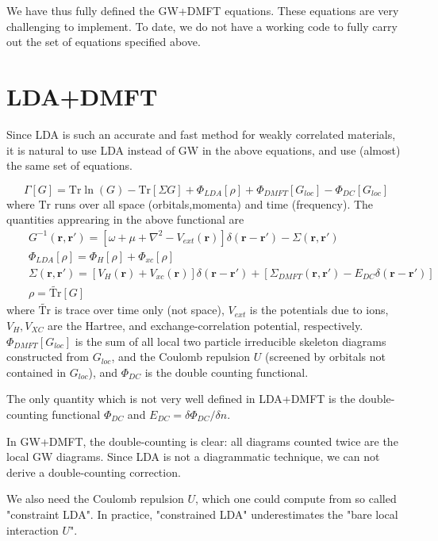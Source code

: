 \documentclass[usenames,letter,landscape,semhelv]{seminar}
\newcommand{\vr}{{\mathbf{r}}}
\renewcommand{\Tr}{\mathrm{Tr}}
\begin{document}
\begin{slide}
We have thus fully defined the GW+DMFT equations. These equations are
very challenging to implement. To date, we do not have a working code
to fully carry out the set of equations specified above.

\newslide

\section{LDA+DMFT}

Since LDA is such an accurate and fast method for weakly correlated
materials, it is natural to use LDA instead of GW in the above
equations, and use (almost) the same set of equations.

\begin{equation}
\Gamma[G] = \Tr\ln(G) - \Tr[\Sigma G] + \Phi_{LDA}[\rho] + \Phi_{DMFT}[G_{loc}] -\Phi_{DC}[G_{loc}]
\label{functional}
\end{equation}
where $\Tr$ runs over all space (orbitals,momenta) and time
(frequency).
The quantities apprearing in the above functional are
\begin{eqnarray}
&& G^{-1}(\vr,\vr') =
  \left[\omega+\mu+\nabla^2-V_{ext}(\vr)\right]\delta(\vr-\vr')-\Sigma(\vr,\vr')
  \label{G1}\\
&& \Phi_{LDA}[\rho] = \Phi_H[\rho] + \Phi_{xc}[\rho]
  \label{P1x}\\
&& \Sigma(\vr,\vr') =
  \left[V_H(\vr)+V_{xc}(\vr)\right]\delta(\vr-\vr') +
  \left[\Sigma_{DMFT}(\vr,\vr')-E_{DC}\delta(\vr-\vr')\right]
  \label{S1}\\
&&  \rho = \widetilde{\Tr}[G]
\nonumber
\end{eqnarray}
where $\widetilde{\Tr}$ is trace over time only (not space), $V_{ext}$
is the potentials due to ions, $V_H, V_{XC}$ are the Hartree, and
exchange-correlation potential, respectively. $\Phi_{DMFT}[G_{loc}]$ is
the sum of all local two particle irreducible skeleton diagrams
constructed from $G_{loc}$, and the Coulomb repulsion $U$ (screened by
orbitals not contained in $G_{loc}$), and $\Phi_{DC}$ is the double
counting functional.


The only quantity which is not very well defined in LDA+DMFT is the
double-counting functional $\Phi_{DC}$ and $E_{DC} = \delta
\Phi_{DC}/\delta n$.

In GW+DMFT, the double-counting is clear: all diagrams counted twice
are the local GW diagrams. Since LDA is not a diagrammatic technique,
we can not derive a double-counting correction.

We also need the Coulomb repulsion $U$, which one could compute from
so called "constraint LDA". In practice, "constrained LDA"
underestimates the "bare local interaction $U$".


\end{slide}
\end{document}
